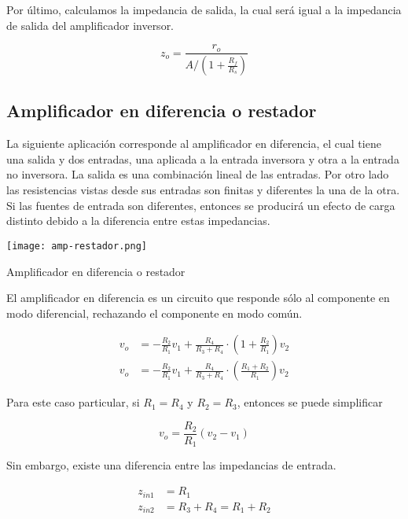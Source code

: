 Por último, calculamos la impedancia de salida, la cual será igual a la
impedancia de salida del amplificador inversor.

\begin{equation}
\boxed{z_o = \frac{r_o}{A / \left( 1 + \frac{R_f}{R_s} \right)}}
\end{equation}


\subsection{Amplificador en diferencia o restador}

La siguiente aplicación corresponde al amplificador en diferencia, el cual
tiene una salida y dos entradas, una aplicada a la entrada inversora y otra a la
entrada no inversora. La salida es una combinación lineal de las entradas. Por
otro lado las resistencias vistas desde sus entradas son finitas y diferentes la
una de la otra. Si las fuentes de entrada son diferentes, entonces se producirá
un efecto de carga distinto debido a la diferencia entre estas impedancias.

\begin{ilustracion}[ht]
    \centering
    \texttt{[image: amp-restador.png]}
    \caption{Amplificador en diferencia o restador}
    \label{ilus:mt-amp-restador}
\end{ilustracion}

El amplificador en diferencia es un circuito que responde sólo al componente en modo diferencial, rechazando el componente en modo común.

\begin{align*}
v_o &= -\frac{R_2}{R_1} v_1 + \frac{R_4}{R_3 + R_4} \cdot \left( 1 + \frac{R_2}{R_1} \right) v_2 \\
v_o &= -\frac{R_2}{R_1} v_1 + \frac{R_4}{R_3 + R_4} \cdot \left( \frac{R_1 + R_2}{R_1} \right) v_2
\end{align*}

Para este caso particular, si $R_1 = R_4$ y $R_2 = R_3$, entonces se puede
simplificar

\begin{equation}
    \boxed{v_o = \frac{R_2}{R_1} (v_2 - v_1)}
    \label{eq:mt-ganancia-restador}
\end{equation}

Sin embargo, existe una diferencia entre las impedancias de entrada.

\begin{align*}
z_{in1} &= R_1 \\
z_{in2} &= R_3 + R_4 = R_1 + R_2
\end{align*}


